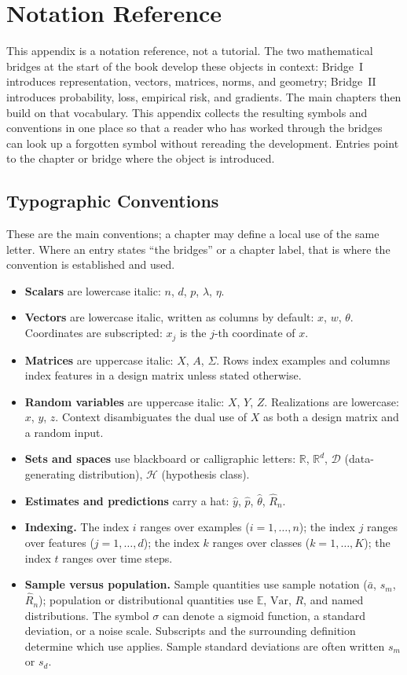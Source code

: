 \chapter{Notation Reference}
\label{app:math}

This appendix is a notation reference, not a tutorial. The two mathematical bridges at the start of the book develop these objects in context: Bridge~I introduces representation, vectors, matrices, norms, and geometry; Bridge~II introduces probability, loss, empirical risk, and gradients. The main chapters then build on that vocabulary. This appendix collects the resulting symbols and conventions in one place so that a reader who has worked through the bridges can look up a forgotten symbol without rereading the development. Entries point to the chapter or bridge where the object is introduced.

\section{Typographic Conventions}

These are the main conventions; a chapter may define a local use of the same letter. Where an entry states ``the bridges'' or a chapter label, that is where the convention is established and used.

\begin{itemize}[leftmargin=*]
\item \textbf{Scalars} are lowercase italic: $n$, $d$, $p$, $\lambda$, $\eta$.
\item \textbf{Vectors} are lowercase italic, written as columns by default: $x$, $w$, $\theta$. Coordinates are subscripted: $x_j$ is the $j$-th coordinate of $x$.
\item \textbf{Matrices} are uppercase italic: $X$, $A$, $\Sigma$. Rows index examples and columns index features in a design matrix unless stated otherwise.
\item \textbf{Random variables} are uppercase italic: $X$, $Y$, $Z$. Realizations are lowercase: $x$, $y$, $z$. Context disambiguates the dual use of $X$ as both a design matrix and a random input.
\item \textbf{Sets and spaces} use blackboard or calligraphic letters: $\mathbb{R}$, $\mathbb{R}^d$, $\mathcal{D}$ (data-generating distribution), $\mathcal{H}$ (hypothesis class).
\item \textbf{Estimates and predictions} carry a hat: $\hat{y}$, $\hat{p}$, $\hat{\theta}$, $\hat{R}_n$.
\item \textbf{Indexing.} The index $i$ ranges over examples ($i=1,\ldots,n$); the index $j$ ranges over features ($j=1,\ldots,d$); the index $k$ ranges over classes ($k=1,\ldots,K$); the index $t$ ranges over time steps.
\item \textbf{Sample versus population.} Sample quantities use sample notation ($\bar{a}$, $s_m$, $\hat{R}_n$); population or distributional quantities use $\mathbb{E}$, $\mathrm{Var}$, $R$, and named distributions. The symbol $\sigma$ can denote a sigmoid function, a standard deviation, or a noise scale. Subscripts and the surrounding definition determine which use applies. Sample standard deviations are often written $s_m$ or $s_d$.
\end{itemize}


